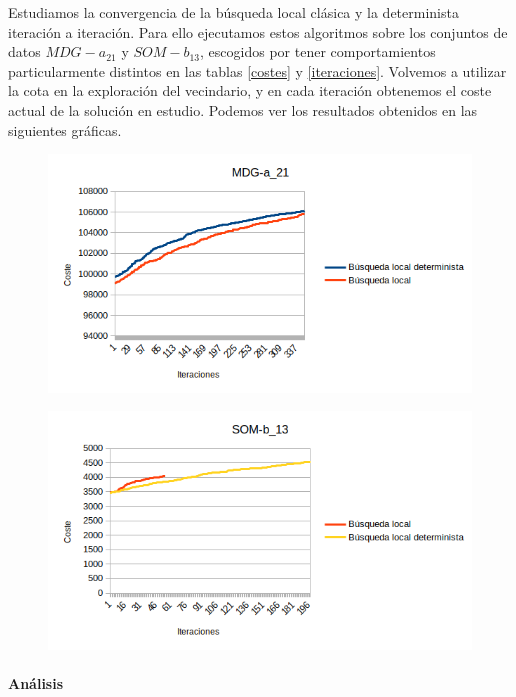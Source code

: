 \documentclass[11pt,a4paper]{article}
\begin{document}
	Estudiamos la convergencia de la búsqueda local clásica y la determinista iteración a iteración. Para ello ejecutamos estos algoritmos sobre los conjuntos de datos $MDG-a_21$ y $SOM-b_13$, escogidos por tener comportamientos particularmente distintos en las tablas \ref{costes} y \ref{iteraciones}. Volvemos a utilizar la cota en la exploración del vecindario, y en cada iteración obtenemos el coste actual de la solución en estudio. Podemos ver los resultados obtenidos en las siguientes gráficas.
	
	\begin{figure}[H] 
		\centering
		\includegraphics[scale=1]{../output/P1/MDG-a_21}
	\end{figure}
	
	\begin{figure}[H] 
		\centering
		\includegraphics[scale=1]{../output/P1/SOM-b_13}%
	\end{figure}

	\paragraph{ Análisis } \ \\
	
\end{document}
